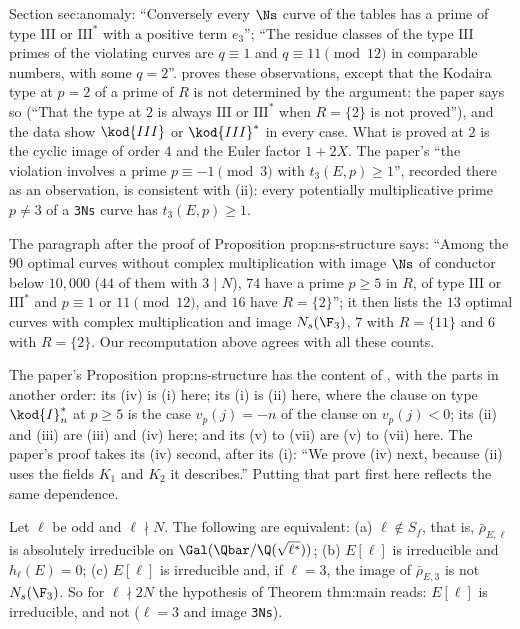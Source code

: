 \begin{paperlink}
Section sec:anomaly: ``Conversely every $\Ns$ curve of the tables has a prime of type $\mathrm{III}$ or $\mathrm{III}^*$ with a positive term $e_3$''; ``The
residue classes of the type $\mathrm{III}$ primes of the violating curves are $q\equiv1$ and $q\equiv11\pmod{12}$ in comparable numbers, with some
$q=2$''.  proves these observations, except that the Kodaira type at $p=2$ of a prime of $R$ is not determined by the
argument: the paper says so (``That the type at $2$ is always $\mathrm{III}$ or $\mathrm{III}^*$ when $R=\{2\}$ is not proved''), and the data show $\kod{III}$ or
$\kod{III}^*$ in every case. What is proved at $2$ is the cyclic image of order $4$ and the Euler factor $1+2X$. The paper's ``the violation involves a prime
$p\equiv-1\pmod3$ with $t_3(E,p)\ge1$'', recorded there as an observation, is consistent with (ii): every potentially multiplicative prime $p\ne3$ of a \texttt{3Ns} curve has $t_3(E,p)\ge1$.

The paragraph after the proof of Proposition prop:ns-structure says: ``Among the $90$ optimal curves without complex multiplication with image
$\Ns$ of conductor below $10{,}000$ ($44$ of them with $3\mid N$), $74$ have a prime $p\ge5$ in $R$, of type $\mathrm{III}$ or $\mathrm{III}^*$ and $p\equiv1$ or
$11\pmod{12}$, and $16$ have $R=\{2\}$''; it then lists the $13$ optimal curves with complex multiplication and image $N_s(\F_3)$, $7$ with $R=\{11\}$ and $6$
with $R=\{2\}$. Our recomputation above agrees with all these counts.
\end{paperlink}

\begin{paperlink}
The paper's Proposition prop:ns-structure has the content of , with the parts in another order: its (iv) is (i)
here; its (i) is (ii) here, where the clause on type $\kod{I}_n^*$ at $p\ge5$ is the case $v_p(j)=-n$ of the clause on $v_p(j)<0$; its (ii) and (iii) are (iii) and
(iv) here; and its (v) to (vii) are (v) to (vii) here. The paper's proof takes its (iv) second, after its (i): ``We prove (iv) next, because (ii) uses the fields $K_1$ and $K_2$ it
describes.'' Putting that part first here reflects the same dependence.
\end{paperlink}

\begin{corollary}\label{cor:galrep:Sf}
Let $\ell$ be odd and $\ell\nmid N$. The following are equivalent: (a) $\ell\notin S_f$, that is, $\bar\rho_{E,\ell}$ is absolutely irreducible on $\Gal(\Qbar/\Q(\sqrt{\ell^*}))$;
(b) $E[\ell]$ is irreducible and $h_\ell(E)=0$; (c) $E[\ell]$ is irreducible and, if $\ell=3$, the image of $\bar\rho_{E,3}$ is not $N_s(\F_3)$. So for $\ell\nmid2N$ the hypothesis of
Theorem thm:main reads: $E[\ell]$ is irreducible, and not ($\ell=3$ and image \texttt{3Ns}).
\end{corollary}

